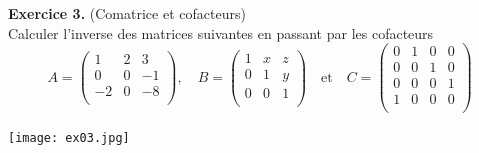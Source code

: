 \documentclass[a4paper, 10pt]{report}
\begin{document}
	\newpage
	
	\fancyhf{}
	\renewcommand{\headrule}
	{\rule{\textwidth}{0pt}}
	
	\noindent
	\textbf{Exercice 3.} (Comatrice et cofacteurs)\\
	Calculer l'inverse des matrices suivantes en passant par les cofacteurs
	\[
	A =
	\begin{pmatrix}
		1 & 2 & 3\\
		0 & 0 & -1\\
		-2 & 0 & -8\\
	\end{pmatrix}
	,\quad
	B =
	\begin{pmatrix}
		1 & x & z\\
		0 & 1 & y\\
		0 & 0 & 1\\
	\end{pmatrix}
	\quad \text{et} \quad
	C =
	\begin{pmatrix}
		0 & 1 & 0 & 0\\
		0 & 0 & 1 & 0\\
		0 & 0 & 0 & 1\\
		1 & 0 & 0 & 0\\
	\end{pmatrix}
	\]
	
	\texttt{[image: ex03.jpg]}
	
	\newpage
	
\end{document}
